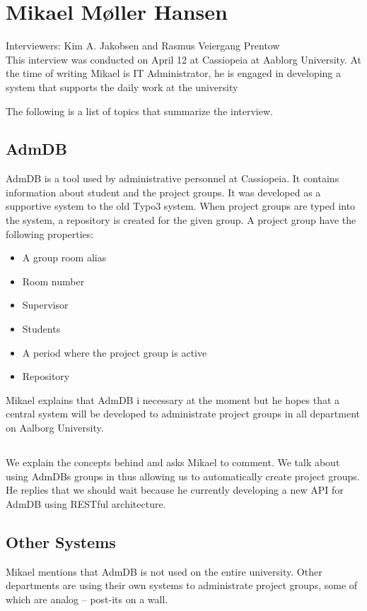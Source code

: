 
\section{Mikael Møller Hansen}
\label{sec:mikael}
Interviewers: Kim A. Jakobsen and Rasmus Veiergang Prentow\\

This interview was conducted on April 12\ths{} at Cassiopeia at Aablorg University.
At the time of writing Mikael is IT Administrator, he is engaged in developing a system that supports the daily work at the university

The following is a list of topics that summarize the interview.

\subsection*{AdmDB}
AdmDB is a tool used by administrative personnel at Cassiopeia.
It contains information about student and the project groups.
It was developed as a supportive system to the old Typo3 system. When project groups are typed into the system, a repository is created for the given group. A project group have the following properties:
\begin{itemize}
	\item A group room alias
	\item Room number
	\item Supervisor
	\item Students
	\item A period where the project group is active
	\item Repository
\end{itemize}

Mikael explains that AdmDB i necessary at the moment but he hopes that a central system will be developed to administrate project groups in all department on Aalborg University. 

\subsection*{\system{}}
We explain the concepts behind \system{} and asks Mikael to comment. 
We talk about using AdmDBs groups in \system{} thus allowing us to automatically create project groups. 
He replies that we should wait because he currently developing a new API for AdmDB using RESTful architecture. 

\subsection*{Other Systems}
Mikael mentions that AdmDB is not used on the entire university.
Other departments are using their own systems to administrate project groups, some of which are analog -- post-its on a wall.